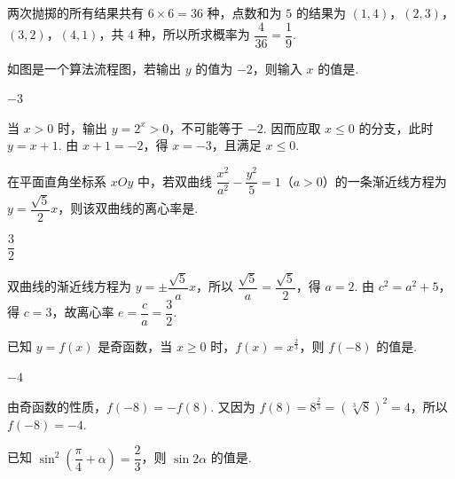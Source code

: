 \begin{solution}
两次抛掷的所有结果共有 \(6\times6=36\) 种，点数和为 \(5\) 的结果为 \((1,4)\)，\((2,3)\)，\((3,2)\)，\((4,1)\)，共 \(4\) 种，所以所求概率为 \(\dfrac4{36}=\dfrac19\).
\end{solution}

\begin{problem}
如图是一个算法流程图，若输出 \(y\) 的值为 \(-2\)，则输入 \(x\) 的值是\fillinblank{}.

\end{problem}

\begin{answer}
\(-3\)
\end{answer}

\begin{solution}
当 \(x>0\) 时，输出 \(y=2^x>0\)，不可能等于 \(-2\). 因而应取 \(x\leq0\) 的分支，此时 \(y=x+1\). 由 \(x+1=-2\)，得 \(x=-3\)，且满足 \(x\leq0\).
\end{solution}

\begin{problem}
在平面直角坐标系 \(xOy\) 中，若双曲线 \(\dfrac{x^2}{a^2}-\dfrac{y^2}{5}=1\)（\(a>0\)）的一条渐近线方程为 \(y=\dfrac{\sqrt5}{2}x\)，则该双曲线的离心率是\fillinblank{}.
\end{problem}

\begin{answer}
\(\dfrac32\)
\end{answer}

\begin{solution}
双曲线的渐近线方程为 \(y=\pm\dfrac{\sqrt5}{a}x\)，所以 \(\dfrac{\sqrt5}{a}=\dfrac{\sqrt5}{2}\)，得 \(a=2\). 由 \(c^2=a^2+5\)，得 \(c=3\)，故离心率 \(e=\dfrac ca=\dfrac32\).
\end{solution}

\begin{problem}
已知 \(y=f(x)\) 是奇函数，当 \(x\ge0\) 时，\(f(x)=x^{\frac23}\)，则 \(f(-8)\) 的值是\fillinblank{}.
\end{problem}

\begin{answer}
\(-4\)
\end{answer}

\begin{solution}
由奇函数的性质，\(f(-8)=-f(8)\). 又因为 \(f(8)=8^{\frac23}=\left(\sqrt[3]{8}\right)^2=4\)，所以 \(f(-8)=-4\).
\end{solution}

\begin{problem}
已知 \(\sin^2\!\left(\dfrac\pi4+\alpha\right)=\dfrac23\)，则 \(\sin2\alpha\) 的值是\fillinblank{}.
\end{problem}

